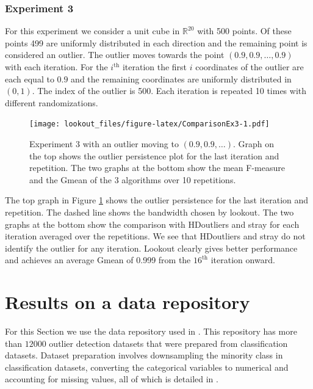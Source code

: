 \documentclass[11pt,a4paper,]{article}
\theoremstyle{definition}
\theoremstyle{definition}
\theoremstyle{definition}
\theoremstyle{remark}
\begin{document}
\hypertarget{sec:exp3}{%
\subsubsection{Experiment 3}\label{sec:exp3}}

For this experiment we consider a unit cube in \(\mathbb{R}^{20}\) with 500 points. Of these points 499 are uniformly distributed in each direction and the remaining point is considered an outlier. The outlier moves towards the point \(\left( 0.9, 0.9, \dots, 0.9 \right)\) with each iteration. For the \(i^{\text{th}}\) iteration the first \(i\) coordinates of the outlier are each equal to \(0.9\) and the remaining coordinates are uniformly distributed in \((0,1)\). The index of the outlier is 500. Each iteration is repeated 10 times with different randomizations.

\begin{figure}
\centering
\texttt{[image: lookout\_files/figure-latex/ComparisonEx3-1.pdf]}
\caption{\label{fig:ComparisonEx3}Experiment 3 with an outlier moving to \((0.9, 0.9, \dots)\). Graph on the top shows the outlier persistence plot for the last iteration and repetition. The two graphs at the bottom show the mean F-measure and the Gmean of the 3 algorithms over 10 repetitions.}
\end{figure}

The top graph in Figure \ref{fig:ComparisonEx3} shows the outlier persistence for the last iteration and repetition. The dashed line shows the bandwidth chosen by lookout. The two graphs at the bottom show the comparison with HDoutliers and stray for each iteration averaged over the repetitions. We see that HDoutliers and stray do not identify the outlier for any iteration. Lookout clearly gives better performance and achieves an average Gmean of 0.999 from the \(16^{\text{th}}\) iteration onward.

\hypertarget{sec:applications}{%
\section{Results on a data repository}\label{sec:applications}}

For this Section we use the data repository used in \textcite{datasets}. This repository has more than \(12000\) outlier detection datasets that were prepared from classification datasets. Dataset preparation involves downsampling the minority class in classification datasets, converting the categorical variables to numerical and accounting for missing values, all of which is detailed in \textcite{normalizationoutliers}.
\end{document}
